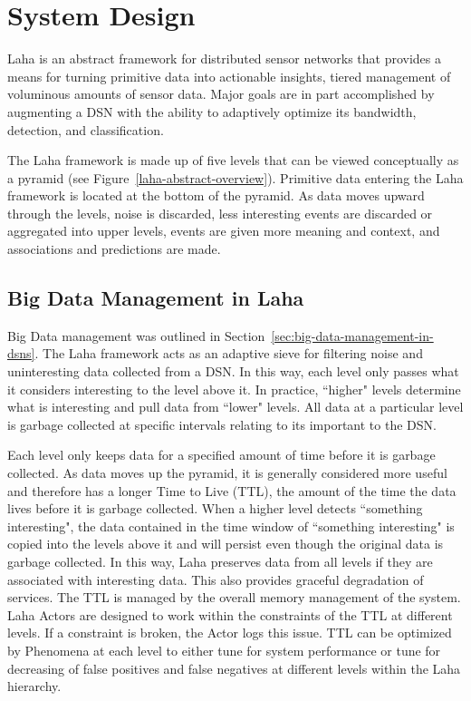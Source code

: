 
\chapter{System Design}\label{ch:system-design}
Laha is an abstract framework for distributed sensor networks that provides a means for turning primitive data into actionable insights, tiered management of voluminous amounts of sensor data. Major goals are in part accomplished by augmenting a DSN with the ability to adaptively optimize its bandwidth, detection, and classification.

The Laha framework is made up of five levels that can be viewed conceptually as a pyramid (see Figure~\ref{laha-abstract-overview}). Primitive data entering the Laha framework is located at the bottom of the pyramid. As data moves upward through the levels, noise is discarded, less interesting events are discarded or aggregated into upper levels, events are given more meaning and context, and associations and predictions are made.

\section{Big Data Management in Laha} \label{sec:big-data-management}
Big Data management was outlined in Section~\ref{sec:big-data-management-in-dsns}. The Laha framework acts as an adaptive sieve for filtering noise and uninteresting data collected from a DSN. In this way, each level only passes what it considers interesting to the level above it. In practice, ``higher" levels determine what is interesting and pull data from ``lower" levels. All data at a particular level is garbage collected at specific intervals relating to its important to the DSN\@.

Each level only keeps data for a specified amount of time before it is garbage collected. As data moves up the pyramid, it is generally considered more useful and therefore has a longer Time to Live (TTL), the amount of the time the data lives before it is garbage collected.  When a higher level detects ``something interesting", the data contained in the time window of ``something interesting" is copied into the levels above it and will persist even though the original data is garbage collected. In this way, Laha preserves data from all levels if they are associated with interesting data. This also provides graceful degradation of services. The TTL is managed by the overall memory management of the system. Laha Actors are designed to work within the constraints of the TTL at different levels. If a constraint is broken, the Actor logs this issue. TTL can be optimized by Phenomena at each level to either tune for system performance or tune for decreasing of false positives and false negatives at different levels within the Laha hierarchy.

